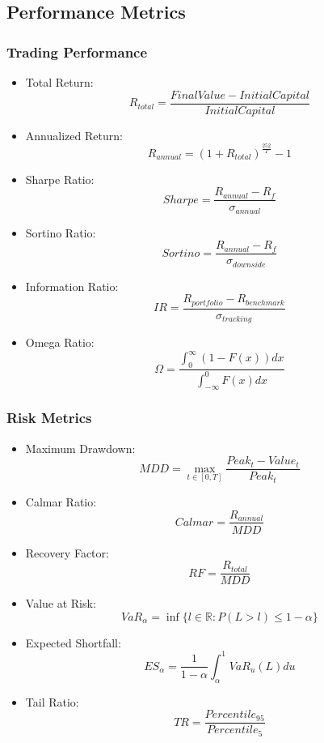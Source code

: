 \documentclass[conference]{IEEEtran}
\begin{document}
\subsection{Performance Metrics}

\subsubsection{Trading Performance}
\begin{itemize}
    \item Total Return: \[ R_{total} = \frac{FinalValue - InitialCapital}{InitialCapital} \]
    \item Annualized Return: \[ R_{annual} = (1 + R_{total})^{\frac{252}{T}} - 1 \]
    \item Sharpe Ratio: \[ Sharpe = \frac{R_{annual} - R_f}{\sigma_{annual}} \]
    \item Sortino Ratio: \[ Sortino = \frac{R_{annual} - R_f}{\sigma_{downside}} \]
    \item Information Ratio: \[ IR = \frac{R_{portfolio} - R_{benchmark}}{\sigma_{tracking}} \]
    \item Omega Ratio: \[ \Omega = \frac{\int_0^\infty (1-F(x))dx}{\int_{-\infty}^0 F(x)dx} \]
\end{itemize}

\subsubsection{Risk Metrics}
\begin{itemize}
    \item Maximum Drawdown: \[ MDD = \max_{t \in [0,T]} \frac{Peak_t - Value_t}{Peak_t} \]
    \item Calmar Ratio: \[ Calmar = \frac{R_{annual}}{MDD} \]
    \item Recovery Factor: \[ RF = \frac{R_{total}}{MDD} \]
    \item Value at Risk: \[ VaR_\alpha = \inf\{l \in \mathbb{R}: P(L > l) \leq 1-\alpha\} \]
    \item Expected Shortfall: \[ ES_\alpha = \frac{1}{1-\alpha} \int_\alpha^1 VaR_u(L)du \]
    \item Tail Ratio: \[ TR = \frac{Percentile_{95}}{Percentile_{5}} \]
\end{itemize}
\end{document}
